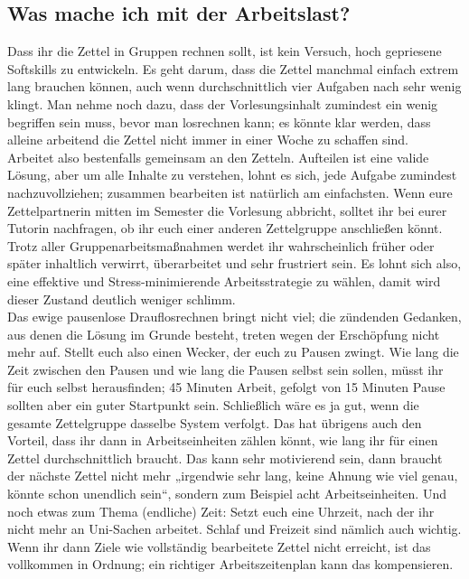 \subsection{Was mache ich mit der Arbeitslast?}
Dass ihr die Zettel in Gruppen rechnen sollt, ist kein Versuch, hoch gepriesene Softskills zu entwickeln. Es geht darum, dass die Zettel manchmal einfach extrem lang brauchen können, auch wenn durchschnittlich vier Aufgaben nach sehr wenig klingt. Man nehme noch dazu, dass der Vorlesungsinhalt zumindest ein wenig begriffen sein muss, bevor man losrechnen kann; es könnte klar werden, dass alleine arbeitend die Zettel nicht immer in einer Woche zu schaffen sind. \\
Arbeitet also bestenfalls gemeinsam an den Zetteln. Aufteilen ist eine valide Lösung, aber um alle Inhalte zu verstehen, lohnt es sich, jede Aufgabe zumindest nachzuvollziehen; zusammen bearbeiten ist natürlich am einfachsten.
Wenn eure Zettelpartnerin mitten im Semester die Vorlesung abbricht, solltet ihr bei eurer Tutorin nachfragen, ob ihr euch einer anderen Zettelgruppe anschließen könnt. \\
Trotz aller Gruppenarbeitsmaßnahmen werdet ihr wahrscheinlich früher oder später inhaltlich verwirrt, überarbeitet und sehr frustriert sein. Es lohnt sich also, eine effektive und Stress-minimierende Arbeitsstrategie zu wählen, damit wird dieser Zustand deutlich weniger schlimm. \\
Das ewige pausenlose Drauflosrechnen bringt nicht viel; die zündenden Gedanken, aus denen die Lösung im Grunde besteht, treten wegen der Erschöpfung nicht mehr auf. Stellt euch also einen Wecker, der euch zu Pausen zwingt. Wie lang die Zeit zwischen den Pausen und wie lang die Pausen selbst sein sollen, müsst ihr für euch selbst herausfinden; 45 Minuten Arbeit, gefolgt von 15 Minuten Pause sollten aber ein guter Startpunkt sein. Schließlich wäre es ja gut, wenn die gesamte Zettelgruppe dasselbe System verfolgt. Das hat übrigens auch den Vorteil, dass ihr dann in Arbeitseinheiten zählen könnt, wie lang ihr für einen Zettel durchschnittlich braucht. Das kann sehr motivierend sein, dann braucht der nächste Zettel nicht mehr „irgendwie sehr lang, keine Ahnung wie viel genau, könnte schon unendlich sein“, sondern zum Beispiel acht Arbeitseinheiten.
Und noch etwas zum Thema (endliche) Zeit: Setzt euch eine Uhrzeit, nach der ihr nicht mehr an Uni-Sachen arbeitet. Schlaf und Freizeit sind nämlich auch wichtig. Wenn ihr dann Ziele wie vollständig bearbeitete Zettel nicht erreicht, ist das vollkommen in Ordnung; ein richtiger Arbeitszeitenplan kann das kompensieren. \\
